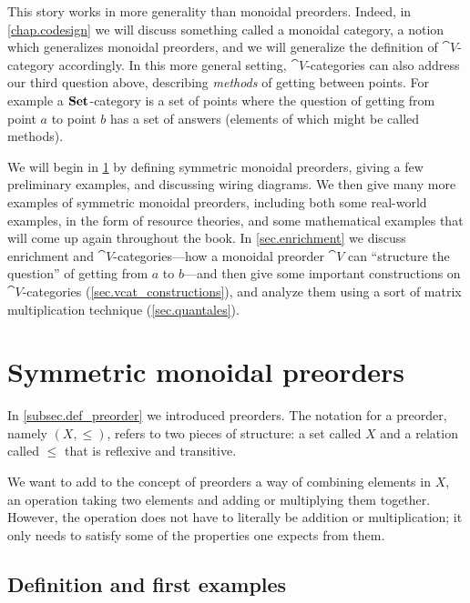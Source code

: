 \documentclass[7Sketches]{subfiles}
\begin{document}
This story works in more generality than monoidal preorders. Indeed, in
\cref{chap.codesign} we will discuss something called a monoidal category, a notion which
generalizes monoidal preorders, and we will generalize the definition of $\cat{V}$-category
accordingly. In this more general setting, $\cat{V}$-categories can also
address our third question above, describing \emph{methods} of getting between points. For example a $\mathbf{Set}$-category is a set of points where the question of getting from point $a$ to point $b$ has a set of answers (elements of which might be called methods).

We will begin in \cref{sec.sym_mon_preorders} by defining symmetric monoidal
preorders, giving a few preliminary examples, and discussing wiring diagrams. We
then give many more examples of symmetric monoidal preorders, including both some
real-world examples, in the form of resource theories, and some mathematical
examples that will come up again throughout the book. In
\cref{sec.enrichment} we discuss enrichment and $\cat{V}$-categories---how a
monoidal preorder $\cat{V}$ can ``structure the question'' of getting from $a$ to $b$---and then give some important constructions on $\cat{V}$-categories
(\cref{sec.vcat_constructions}), and analyze them using a sort of matrix multiplication technique (\cref{sec.quantales}).

\section{Symmetric monoidal preorders}%
\label{sec.sym_mon_preorders}%
%

In \cref{subsec.def_preorder} we introduced preorders. The notation for a preorder, namely $(X,\leq)$, refers to two pieces of structure: a set called $X$ and a relation called $\leq$ that is reflexive and transitive.

We want to add to the concept of preorders a way of combining elements in $X$, an operation
taking two elements and adding or multiplying them together. However, the
operation does not have to literally be addition or multiplication; it only
needs to satisfy some of the properties one expects from them.

\subsection{Definition and first examples}
\end{document}
